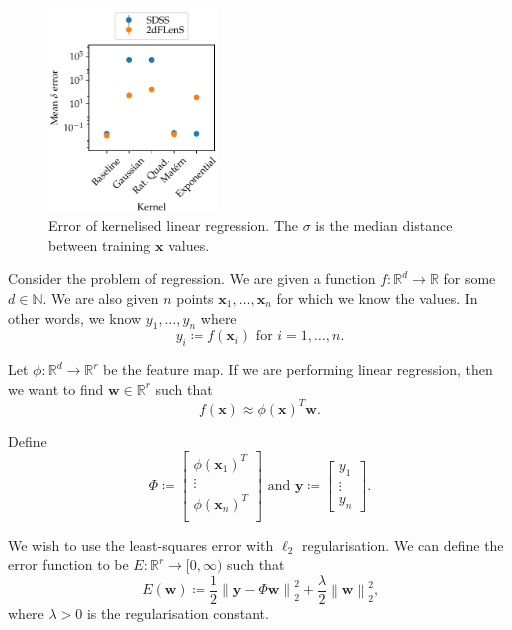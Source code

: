 \documentclass[11pt,twoside]{report}
\newcommand\bbN{\mathbb{N}}
\newcommand\bbR{\mathbb{R}}
\newcommand\bw{\mathbf{w}}
\newcommand\bx{\mathbf{x}}
\newcommand\by{\mathbf{y}}
\newcommand\norm[1]{\left\|#1\right\|}
\begin{document}
  \begin{figure}
    \centering
    \includegraphics[width=0.4\textwidth]{linreg_kernelised.pdf}
    \caption{Error of kernelised linear regression. The $\sigma$ is the median distance between training $\bx$ values.}
    \label{fig:linreg_kernelised}
  \end{figure}

Consider the problem of regression. We are given a function $f : \bbR^d \to \bbR$ for some $d \in \bbN$. We are also given $n$ points $\bx_1, \dots, \bx_n$ for which we know the values. In other words, we know $y_1, \dots, y_n$ where \[
    y_i \coloneqq f(\bx_i)\text{ for }i = 1, \dots, n\text{.}
\]

Let $\phi : \bbR^d \to \bbR^r$ be the feature map. If we are performing linear regression, then we want to find $\bw \in \bbR^r$ such that \[
    f(\bx) \approx \phi(\bx)^T \bw \text{.}
\]

Define \[
    \Phi \coloneqq \begin{bmatrix}
        \phi(\bx_1)^T \\
        \vdots \\
        \phi(\bx_n)^T \\
    \end{bmatrix} \text{ and }\by \coloneqq \begin{bmatrix}
        y_1 \\
        \vdots \\
        y_n
    \end{bmatrix} \text{.}
\]

We wish to use the least-squares error with $\ell_2$ regularisation. We can define the error function to be $E : \bbR^r \to [0, \infty)$ such that \[
    E(\bw) \coloneqq \frac{1}{2}\norm{\by - \Phi\bw}_2^2 + \frac{\lambda}{2} \norm{\bw}_2^2 \text{,}
\] where $\lambda > 0$ is the regularisation constant.
\end{document}

